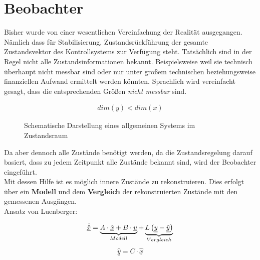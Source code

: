 \section{Beobachter}

Bisher wurde von einer wesentlichen Vereinfachung der Realität ausgegangen. Nämlich dass für Stabilisierung, Zustandsrückführung \etc der gesamte Zustandsvektor des Kontrollsystems zur Verfügung steht. Tatsächlich sind in der Regel nicht alle Zustandsinformationen bekannt. Beispielsweise weil sie technisch überhaupt nicht messbar sind oder nur unter großem technischen beziehungsweise finanziellen Aufwand ermittelt werden könnten. Sprachlich wird
vereinfacht gesagt, dass die entsprechenden Größen \textit{nicht messbar} sind.

\begin{align*}
    dim(y) < dim(x)
\end{align*}

\begin{figure}[H]
    \centering
    \caption[Allgemeines System im Zustandsraum]{Schematische Darstellung eines allgemeinen Systems im Zustandsraum}
    \label{fig:Bild43}
\end{figure}

Da aber dennoch alle Zustände benötigt werden, da die Zustandsregelung darauf basiert, dass zu jedem Zeitpunkt alle Zustände bekannt sind, wird der Beobachter eingeführt.\\
Mit dessen Hilfe ist es möglich innere Zustände zu rekonstruieren. Dies erfolgt über ein \textbf{Modell} und dem \textbf{Vergleich} der rekonstruierten Zustände mit den gemessenen Ausgängen.\\
\newline
Ansatz von Luenberger:

\[
    \underline{\dot{\hat{x}}} = 
    \underbrace{%
        A \cdot \underline{\hat{x}} + B \cdot \underline{u}
    }_{%
    Modell
    }
    + 
    \underbrace{%
    L \left( \underline{y} - \underline{\hat{y}}\right)
    }_{%
    Vergleich
    }
\]
\[
    \underline{\hat{y}} = C \cdot \underline{\hat{x}}
\]

